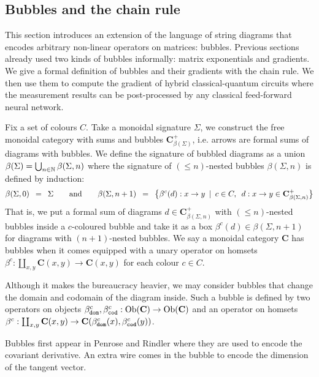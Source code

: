 
\subsection{Bubbles and the chain rule} \label{4-bubbles}

This section introduces an extension of the language of string diagrams
that encodes arbitrary non-linear operators on matrices: bubbles.
Previous sections already used two kinds of bubbles informally:
matrix exponentials and gradients. We give a formal definition of bubbles and
their gradients with the chain rule. We then use them to compute the gradient
of hybrid classical-quantum circuits where the measurement results can be
post-processed by any classical feed-forward neural network.

Fix a set of colours $C$.
Take a monoidal signature $\Sigma$, we construct the free monoidal category with
sums and bubbles $\mathbf{C}_{\beta(\Sigma)}^+$, i.e. arrows are formal sums of
diagrams with bubbles. We define the signature of bubbled diagrams
as a union $\beta(\Sigma) = \bigcup_{n \in \mathbb{N}} \beta(\Sigma, n)$ where the
signature of $(\leq n)$-nested bubbles $\beta(\Sigma, n)$ is defined by
induction:
$$
\beta(\Sigma, 0) \enspace = \enspace \Sigma \qquad \text{and} \qquad
\beta(\Sigma, n + 1) \enspace = \enspace \big\{\beta^c(d) : x \to y \enspace \vert \enspace
c \in C, \enspace d : x \to y \in \mathbf{C}_{\beta(\Sigma, n)}^+ \big\}$$
That is, we put a formal sum of diagrams $d \in \mathbf{C}_{\beta(\Sigma, n)}^+$
with $(\leq n)$-nested bubbles inside a $c$-coloured bubble and take it as a box
$\beta^c(d) \in \beta(\Sigma, n + 1)$ for diagrams with $(n + 1)$-nested
bubbles.
We say a monoidal category $\mathbf{C}$ has bubbles when it comes equipped with
a unary operator on homsets $\beta^c :
\coprod_{x, y} \mathbf{C}(x, y) \to \mathbf{C}(x, y)$ for each colour $c \in C$.

Although it makes the bureaucracy heavier, we may consider bubbles that change
the domain and codomain of the diagram inside. Such a bubble is defined by two
operators on objects
$\beta^c_{\mathtt{dom}}, \beta^c_{\mathtt{cod}} : \text{Ob}(\mathbf{C}) \to \text{Ob}(\mathbf{C})$
and an operator on homsets $\beta^c : \coprod_{x, y}
\mathbf{C}(x, y) \to \mathbf{C}(\beta^c_{\mathtt{dom}}(x), \beta^c_{\mathtt{cod}}(y))$.

\begin{example}
Bubbles first appear in Penrose and Rindler \cite{PenroseRindler84}
where they are used to encode the covariant derivative. An extra wire comes in
the bubble to encode the dimension of the tangent vector.
\end{example}

